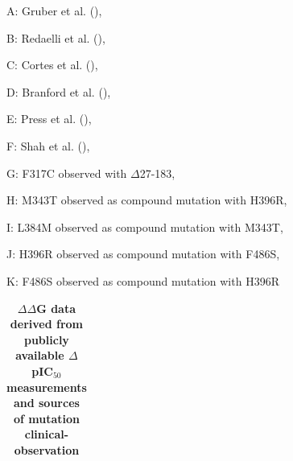 \documentclass[phd,tocprelim]{cornell}
\begin{document}
\begin{landscape}
\realsinglespacing
\begin{ThreePartTable}
	\begin{TableNotes}
		\footnotesize
		\item{A}: Gruber et al. (\cite{Gruber:Med.Oncol.:2012}), %
		\item{B}: Redaelli et al. (\cite{Redaelli:2012}), %
		\item{C}: Cortes et al. (\cite{Cortes:N.Engl.J.Med.:2012}), %
		\item{D}: Branford et al. (\cite{Branford:Blood:2002}), %
		\item{E}: Press et al. (\cite{Press:2009}), %
		\item{F}: Shah et al. (\cite{Shah:CancerCell:2002}), %
		\item{G}: F317C observed with $\Delta$27-183, %
		\item{H}: M343T observed as compound mutation with H396R, %
		\item{I}: L384M observed as compound mutation with M343T, %
		\item{J}: H396R observed as compound mutation with F486S, %
		\item{K}: F486S observed as compound mutation with H396R 
	\end{TableNotes}
\begin{longtable}[c]{llllllllll}
	\caption[ $\Delta \Delta$G data derived from publicly available $\Delta$pIC$_{50}$ measurements and sources of mutation clinical-observation]{
		{\bf $\Delta \Delta$G data derived from publicly available $\Delta$pIC$_{50}$ measurements and sources of mutation clinical-observation}		
	}
	

\end{longtable}
\end{ThreePartTable}
\end{landscape}
\end{document}

